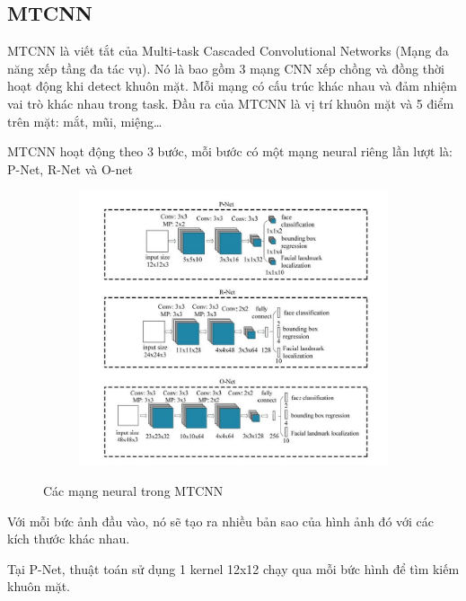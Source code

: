 \newpage
\subsection{MTCNN}

MTCNN là viết tắt của Multi-task Cascaded Convolutional Networks (Mạng đa năng xếp tầng đa tác vụ).
Nó là bao gồm 3 mạng CNN xếp chồng và đồng thời hoạt động khi detect khuôn mặt.
Mỗi mạng có cấu trúc khác nhau và đảm nhiệm vai trò khác nhau trong task.
Đầu ra của MTCNN là vị trí khuôn mặt và 5 điểm trên mặt: mắt, mũi, miệng…

MTCNN hoạt động theo 3 bước, mỗi bước có một mạng neural riêng lần lượt là: P-Net, R-Net và O-net

\begin{figure}
    \begin{subfigure}{1.\textwidth}
        \begin{center}
            \includegraphics[width=1.\linewidth]{Chapters/items/chap2_9.jpg}
        \end{center}
        \label{fig:chap2_9}
    \end{subfigure}
    \caption{Các mạng neural trong MTCNN}
\end{figure}

\newpage
Với mỗi bức ảnh đầu vào, nó sẽ tạo ra nhiều bản sao của hình ảnh đó với các kích thước khác nhau.

Tại P-Net, thuật toán sử dụng 1 kernel 12x12 chạy qua mỗi bức hình để tìm kiếm khuôn mặt.

